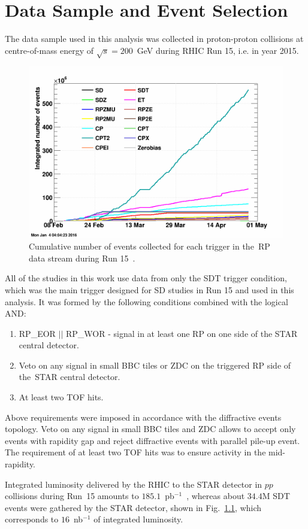\chapter{Data Sample and Event Selection}\label{section:star_data_sample}\label{section:star_trigger_selection}
The data sample used in this analysis was collected in proton-proton collisions at centre-of-mass energy of $\sqrt{s}=200$~GeV during RHIC Run 15, i.e. in year 2015. %

\begin{figure}[h!]
	\centering
	\includegraphics[width=.6\textwidth]{chapters/dataSampleSTAR/img/nEvents.png}
	\caption{Cumulative number of events collected for each trigger in the~\ac{RP} data stream during Run 15~\cite{pp2ppTrigers,runLogBrowser}. }
	\label{fig:lumiRHIC}
\end{figure}

All of the studies in this work use data from only the SDT trigger condition, which was the main trigger designed for SD studies in Run 15 and used in this analysis. It was formed by the following conditions combined with the logical AND:
\begin{enumerate}
	\item RP\_EOR $||$ RP\_WOR - signal in at least one RP on one side of the STAR central detector.
	\item Veto on any signal in small BBC tiles or ZDC on the triggered RP  side of the~STAR central detector.
	\item At least two TOF hits.
\end{enumerate}
Above requirements were imposed in accordance with the diffractive events topology. Veto on any signal in small BBC tiles and ZDC allows to accept only events with rapidity gap and reject diffractive events with parallel pile-up event. The requirement of at least two TOF hits was to ensure activity in the mid-rapidity.

Integrated luminosity delivered by the RHIC to the STAR detector in $pp$ collisions during Run~15 amounts to $185.1$~pb$^{-1}$~\cite{RHIC:rhicRunLuminosity}, whereas about $34.4$M SDT events were gathered by the STAR detector, shown in Fig.~\ref{fig:lumiRHIC}, which corresponds to $16$~nb$^{-1}$ of integrated luminosity.
